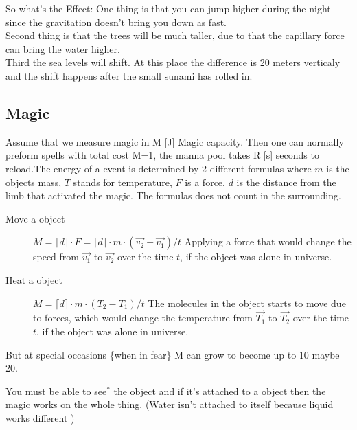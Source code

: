 \documentclass{article}
\begin{document}
So what's the Effect: 
One thing is that you can jump higher during the night since the gravitation doesn't bring you down as fast.\\

Second thing is that the trees will be much taller, due to that the capillary force can bring the water higher.\\

Third the sea levels will shift. At this place the difference is 20 meters verticaly and the shift happens after the small sunami has rolled in.


\subsection{Magic}%
\label{magic}



Assume that we measure magic in M [J] {Magic capacity}. Then one can normally preform spells with total cost M=1, the manna pool takes R [s] seconds to reload.The energy of a event is determined by 2 different formulas where $m$ is the objects mass, $T$ stands for temperature, $F$ is a force, $d$ is the distance from the limb that activated the magic. The formulas does not count in the surrounding.
\begin{description}
\item[Move a object]$ M =\lceil d\rceil\cdot  F =\lceil d\rceil\cdot  m \cdot(\vec{v_2}-\vec{v_1})/t$ Applying a force that would change the speed from $\vec{v_1}$ to $\vec{v_2}$ over the time $t$, if the object was alone in universe.

\item[Heat a object] $M =\lceil d\rceil\cdot m \cdot (T_2 - T_1)/t$ The molecules in the object starts to move due to forces, which would change the temperature from $\vec{T_1}$ to $\vec{T_2}$ over the time $t$, if the object was alone in universe.
\end{description}

But at special occasions \{when in fear\} M can grow to become up to 10 maybe 20.

You must be able to see$^*$ the object and if it's attached to a object then the magic works on the whole thing. (Water isn't attached to itself because liquid works different )
\end{document}
